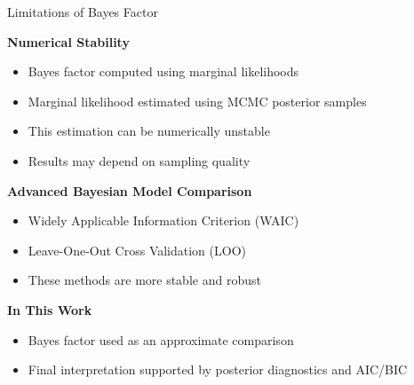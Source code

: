 \documentclass[aspectratio=169]{beamer}
\begin{document}
\begin{frame}{Limitations of Bayes Factor}

\footnotesize

\textbf{Numerical Stability}

\begin{itemize}

\item Bayes factor computed using marginal likelihoods

\item Marginal likelihood estimated using MCMC posterior samples

\item This estimation can be numerically unstable

\item Results may depend on sampling quality

\end{itemize}

\vspace{0.3cm}

\textbf{Advanced Bayesian Model Comparison}

\begin{itemize}

\item Widely Applicable Information Criterion (WAIC)

\item Leave-One-Out Cross Validation (LOO)

\item These methods are more stable and robust

\end{itemize}

\vspace{0.2cm}

\textbf{In This Work}

\begin{itemize}

\item Bayes factor used as an approximate comparison

\item Final interpretation supported by posterior diagnostics and AIC/BIC

\end{itemize}

\end{frame}
\end{document}
